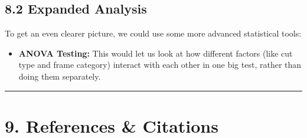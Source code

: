 \documentclass[10pt,a4paper]{article}
\begin{document}
\subsection{8.2 Expanded Analysis}
To get an even clearer picture, we could use some more advanced statistical tools:
\begin{itemize}
    \item \textbf{ANOVA Testing:} This would let us look at how different factors (like cut type and frame category) interact with each other in one big test, rather than doing them separately.
\end{itemize}

\rule{\linewidth}{0.4pt}

\section{9. References \& Citations}
\end{document}
